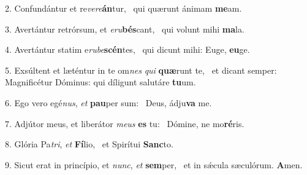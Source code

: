2. Confundántur et re\textit{ve}\textit{re}\textbf{án}tur, \ast\  qui quærunt ánimam \textbf{me}am.\

3. Avertántur retrórsum, et \textit{e}\textit{ru}\textbf{bés}cant, \ast\  qui volunt mihi \textbf{ma}la.\

4. Avertántur statim e\textit{ru}\textit{be}\textbf{scén}tes, \ast\  qui dicunt mihi: Euge, \textbf{eu}ge.\

5. Exsúltent et læténtur in te om\textit{nes} \textit{qui} \textbf{quæ}runt te, \ast\  et dicant semper: Magnificétur Dóminus: qui díligunt salutáre \textbf{tu}um.\

6. Ego vero egé\textit{nus}, \textit{et} \textbf{pau}per sum: \ast\  Deus, ádju\textbf{va} me.\

7. Adjútor meus, et liberátor \textit{me}\textit{us} \textbf{es} tu: \ast\  Dómine, ne mo\textbf{ré}ris.\

8. Glória Pa\textit{tri}, \textit{et} \textbf{Fí}lio, \ast\  et Spirítui \textbf{Sanc}to.\

9. Sicut erat in princípio, et \textit{nunc}, \textit{et} \textbf{sem}per, \ast\  et in sǽcula sæculórum. \textbf{A}men.\

